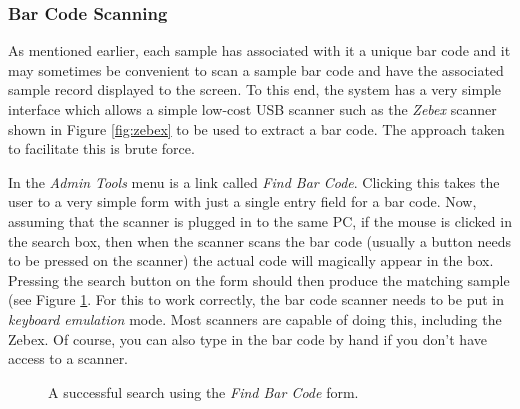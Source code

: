 \documentclass[12pt,twoside]{article}
\begin{document}
\subsubsection{Bar Code Scanning}
As mentioned earlier, each sample has associated with it a unique
bar code and it may sometimes be convenient to scan a sample bar code
and have the associated sample record displayed to the screen.
To this end, the system has a very simple interface which allows
a simple low-cost USB scanner such as the \emph{Zebex} scanner shown in 
Figure \ref{fig:zebex} to be used to extract a bar code.
The approach taken to facilitate this is brute force.

In the \emph{Admin Tools} menu is a link called \emph{Find Bar Code}.
Clicking this takes the user to a very simple form with just a single
entry field for a bar code. Now, assuming that the scanner is plugged in to
the same PC, if the mouse is clicked in the search box, then when the
scanner scans the bar code (usually a button needs to be pressed on the 
scanner) the actual code will magically appear in the box. Pressing
the search button on the form should then produce the matching sample
(see Figure \ref{fig:barcodeform}. 
For this to work correctly, the
bar code scanner needs to be put in \emph{keyboard emulation} mode.
Most scanners are capable of doing this, including the Zebex.
Of course, you can also type in the bar code by hand if you don't
have access to a scanner.

\begin{figure}[!htb]
\begin{center}
\caption{A successful search using the \emph{Find Bar Code} form.
\label{fig:barcodeform}}
\end{center}
\end{figure}
\end{document}
